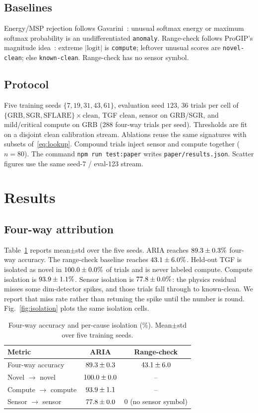 \documentclass[journal]{IEEEtran}
\begin{document}
\subsection{Baselines}
Energy/MSP rejection follows Gavarini~\cite{gavarini2022,hendrycks2017,liu2020}: unusual softmax energy or maximum softmax probability is an undifferentiated \texttt{anomaly}. Range-check follows ProGIP's magnitude idea~\cite{progip2025}: extreme $\lvert\mathrm{logit}\rvert$ is \texttt{compute}; leftover unusual scores are \texttt{novel-clean}; else \texttt{known-clean}. Range-check has no sensor symbol.

\subsection{Protocol}
Five training seeds $\{7,19,31,43,61\}$, evaluation seed $123$, $36$ trials per cell of $\{\mathrm{GRB},\mathrm{SGR},\mathrm{SFLARE}\}\times\mathrm{clean}$, TGF clean, sensor on GRB/SGR, and mild/critical compute on GRB ($288$ four-way trials per seed). Thresholds are fit on a disjoint clean calibration stream. Ablations reuse the same signatures with subsets of~\eqref{eq:lookup}. Compound trials inject sensor and compute together ($n=80$). The command \texttt{npm run test:paper} writes \texttt{paper/results.json}. Scatter figures use the same seed-7 / eval-123 stream.

\section{Results}

\subsection{Four-way attribution}
Table~\ref{tab:main} reports mean$\pm$std over the five seeds. ARIA reaches $89.3\pm0.3\%$ four-way accuracy. The range-check baseline reaches $43.1\pm6.0\%$. Held-out TGF is isolated as novel in $100.0\pm0.0\%$ of trials and is never labeled compute. Compute isolation is $93.9\pm1.1\%$. Sensor isolation is $77.8\pm0.0\%$: the physics residual misses some dim-detector spikes, and those trials fall through to known-clean. We report that miss rate rather than retuning the spike until the number is round. Fig.~\ref{fig:isolation} plots the same isolation cells.

\begin{table}[!t]
\caption{Four-way accuracy and per-cause isolation (\%). Mean$\pm$std over five training seeds.}
\label{tab:main}
\centering
\begin{tabular}{lcc}
\toprule
Metric & ARIA & Range-check \\
\midrule
Four-way accuracy & $89.3\pm0.3$ & $43.1\pm6.0$ \\
Novel $\to$ novel & $100.0\pm0.0$ & -- \\
Compute $\to$ compute & $93.9\pm1.1$ & -- \\
Sensor $\to$ sensor & $77.8\pm0.0$ & $0$ (no sensor symbol) \\
\bottomrule
\end{tabular}
\end{table}
\end{document}
